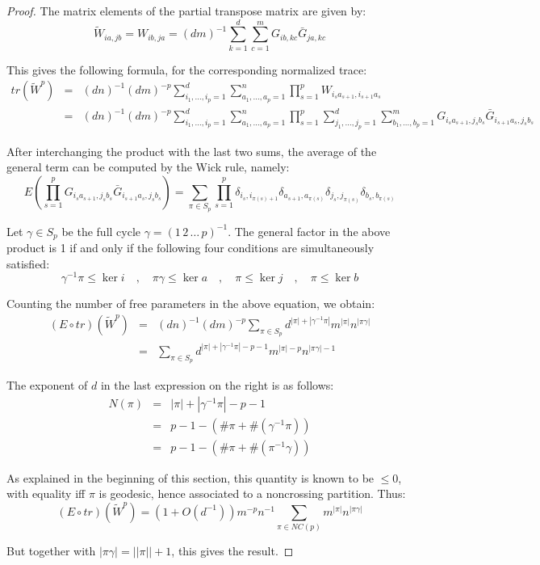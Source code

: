 \documentclass[12pt]{amsbook}
\begin{document}
\begin{proof}
The matrix elements of the partial transpose matrix are given by:
$$\widetilde{W}_{ia,jb}=W_{ib,ja}=(dm)^{-1}\sum_{k=1}^d\sum_{c=1}^mG_{ib,kc}\bar{G}_{ja,kc}$$

This gives the following formula, for the corresponding normalized trace:
\begin{eqnarray*}
tr(\widetilde{W}^p)
&=&(dn)^{-1}(dm)^{-p}\sum_{i_1,\ldots,i_p=1}^d\sum_{a_1,\ldots,a_p=1}^n\prod_{s=1}^p W_{i_sa_{s+1},i_{s+1}a_s} \\
&=&(dn)^{-1}(dm)^{-p}\sum_{i_1,\ldots,i_p=1}^d\sum_{a_1,\ldots,a_p=1}^n\prod_{s=1}^p \sum_{j_1,\ldots,j_p=1}^d\sum_{b_1,\ldots,b_p=1}^mG_{i_sa_{s+1},j_sb_s}\bar{G}_{i_{s+1}a_s,j_sb_s}
\end{eqnarray*}

After interchanging the product with the last two sums, the average of the general term can be computed by the Wick rule, namely:
$$E\left(\prod_{s=1}^pG_{i_sa_{s+1},j_sb_s}\bar{G}_{i_{s+1}a_s,j_sb_s}\right)
=\sum_{\pi\in S_p}\prod_{s=1}^p\delta_{i_s,i_{\pi(s)+1}}\delta_{a_{s+1},a_{\pi(s)}}\delta_{j_s,j_{\pi(s)}}\delta_{b_s,b_{\pi(s)}}$$

Let $\gamma\in S_p$ be the full cycle $\gamma=(1 \, 2 \, \ldots \, p)^{-1}$. The general factor in the above product is 1 if and only if the following four conditions are simultaneously satisfied:
$$\gamma^{-1}\pi\leq \ker i\quad,\quad
\pi\gamma \leq \ker a\quad,\quad
\pi \leq \ker j\quad,\quad
\pi \leq \ker b$$

Counting the number of free parameters in the above equation, we obtain:
\begin{eqnarray*}
(E\circ tr)(\widetilde{W}^p)
&=&(dn)^{-1}(dm)^{-p}\sum_{\pi\in S_p}d^{|\pi|+|\gamma^{-1}\pi|}m^{|\pi|}n^{|\pi\gamma|}\\
&=&\sum_{\pi\in S_p}d^{|\pi|+|\gamma^{-1}\pi|-p-1}m^{|\pi|-p}n^{|\pi\gamma|-1}
\end{eqnarray*}

The exponent of $d$ in the last expression on the right is as follows:
\begin{eqnarray*}
N(\pi)
&=&|\pi|+|\gamma^{-1}\pi|-p-1\\
&=&p-1-(\#\pi+\#(\gamma^{-1}\pi))\\
&=&p-1-(\#\pi+\#(\pi^{-1}\gamma))
\end{eqnarray*}

As explained in the beginning of this section, this quantity is known to be $\leq 0$, with equality iff $\pi$ is geodesic, hence associated to a noncrossing partition. Thus:
$$(E\circ tr)(\widetilde{W}^p)=(1+O(d^{-1}))m^{-p}n^{-1}\sum_{\pi\in NC(p)}m^{|\pi|} n^{|\pi\gamma|}$$

But together with $|\pi\gamma|=||\pi||+1$, this gives the result.
\end{proof}
\end{document}
